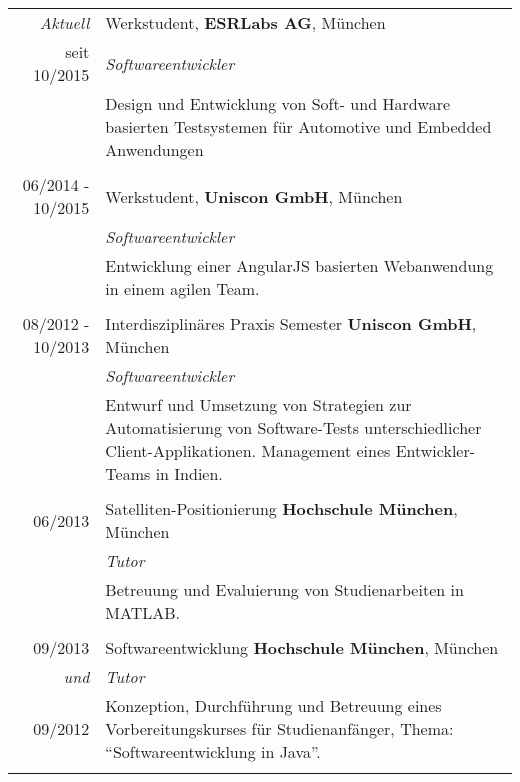 \documentclass[a4paper,10pt]{article} %
\begin{document}
\begin{tabular}{r|p{11cm}}
 
\emph{Aktuell}             & Werkstudent, \textbf{ESRLabs AG}, München\\
seit \textsc{10/2015}      & \emph{Softwareentwickler}\\
                           & \small{Design und Entwicklung von Soft- und Hardware basierten Testsystemen für Automotive und Embedded Anwendungen} \\
\multicolumn{2}{c}{} \\

 \textsc{06/2014 - 10/2015}           & Werkstudent, \textbf{Uniscon GmbH}, München\\
      & \emph{Softwareentwickler}\\
                           & \small{Entwicklung einer AngularJS basierten Webanwendung in einem agilen Team.} \\
\multicolumn{2}{c}{} \\
\textsc{08/2012 - 10/2013} & Interdisziplinäres Praxis Semester \textbf{Uniscon GmbH}, München\\
                           & \emph{Softwareentwickler}\\
 & \small{Entwurf und Umsetzung von Strategien zur Automatisierung von Software-Tests unterschiedlicher Client-Applikationen. Management eines Entwickler-Teams in Indien.} \\
\multicolumn{2}{c}{} \\
 
 
\textsc{06/2013}           & Satelliten-Positionierung \textbf{Hochschule München}, München\\
                           & \emph{Tutor}\\
                           & \small{Betreuung und Evaluierung von Studienarbeiten in MATLAB.}\\
\multicolumn{2}{c}{} \\
 
 
\textsc{09/2013}           & Softwareentwicklung \textbf{Hochschule München}, München\\
\emph{und}                 & \emph{Tutor}\\
\textsc{09/2012}           & \small{Konzeption, Durchführung und Betreuung eines Vorbereitungskurses für Studienanfänger, Thema: ``Softwareentwicklung in Java''.}\\
\multicolumn{2}{c}{} \\
 

\end{tabular}
\end{document}
